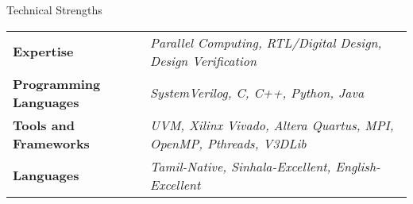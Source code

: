 \documentclass[
	11pt, %
]{./assets/resume} %
\begin{document}
	




\begin{rSection}{Technical Strengths}

	\def\arraystretch{1.5}

	\begin{tabular}{ l l}
		\textbf{Expertise} & \emph{Parallel Computing, RTL/Digital Design, Design Verification} \\
		\textbf{Programming Languages} & \emph{SystemVerilog, C, C++, Python, Java} \\
		\textbf{Tools and Frameworks} & \emph{UVM, Xilinx Vivado, Altera Quartus, MPI, OpenMP, Pthreads, V3DLib} \\ 
		\textbf{Languages} & \emph{Tamil-Native, Sinhala-Excellent, English-Excellent} \\
	\end{tabular}

\end{rSection}
\end{document}
